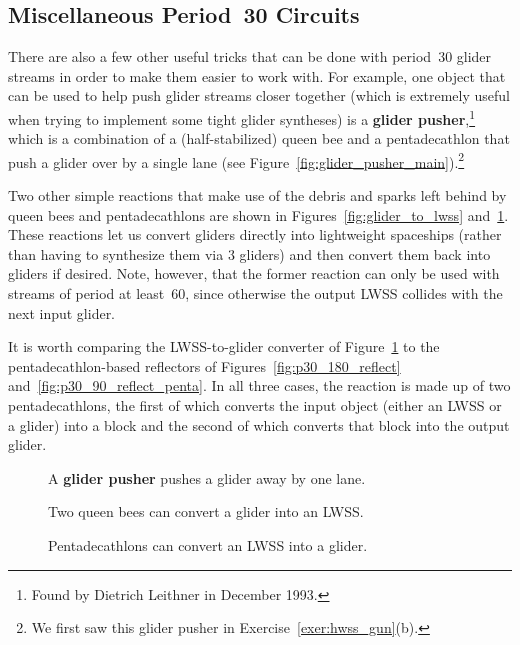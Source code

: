 \subsection{Miscellaneous Period~30 Circuits}\label{sec:p30_misc_circuits}

There are also a few other useful tricks that can be done with period~$30$ glider streams in order to make them easier to work with. For example, one object that can be used to help push glider streams closer together (which is extremely useful when trying to implement some tight glider syntheses) is a \textbf{glider pusher},\footnote{Found by Dietrich Leithner in December 1993.} which is a combination of a (half-stabilized) queen bee and a pentadecathlon that push a glider over by a single lane (see Figure~\ref{fig:glider_pusher_main}).\footnote{We first saw this glider pusher in Exercise~\ref{exer:hwss_gun}(b).}

Two other simple reactions that make use of the debris and sparks left behind by queen bees and pentadecathlons are shown in Figures~\ref{fig:glider_to_lwss} and~\ref{fig:lwss_to_glider}. These reactions let us convert gliders directly into lightweight spaceships (rather than having to synthesize them via $3$ gliders) and then convert them back into gliders if desired. Note, however, that the former reaction can only be used with streams of period at least~$60$, since otherwise the output LWSS collides with the next input glider.

It is worth comparing the LWSS-to-glider converter of Figure~\ref{fig:lwss_to_glider} to the pentadecathlon-based reflectors of Figures~\ref{fig:p30_180_reflect} and~\ref{fig:p30_90_reflect_penta}. In all three cases, the reaction is made up of two pentadecathlons, the first of which converts the input object (either an LWSS or a glider) into a block and the second of which converts that block into the output glider.

\begin{figure}[!htb]
	\centering
	\begin{minipage}{0.27\textwidth}
		\centering
		\caption{A \textbf{glider pusher} pushes a glider away by one lane.}\label{fig:glider_pusher_main}
	\end{minipage}\quad
	\begin{minipage}{0.4\textwidth}
		\centering\vspace*{-0.1cm}
		\caption{Two queen bees can convert a glider into an LWSS.}\label{fig:glider_to_lwss}
	\end{minipage}\quad
	\begin{minipage}{0.27\textwidth}
		\centering\vspace*{0.05cm}
		\caption{Pentadecathlons can convert an LWSS into a glider.}\label{fig:lwss_to_glider}
	\end{minipage}
\end{figure}

